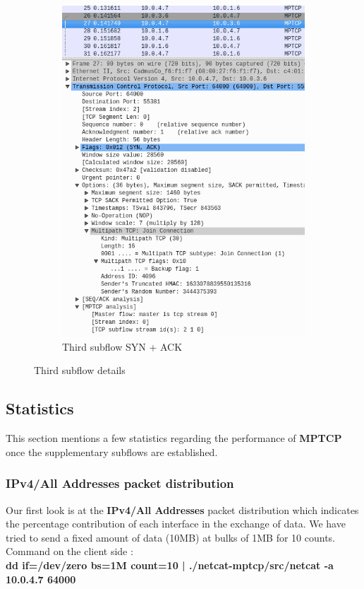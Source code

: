 \documentclass[a4paper,11pt]{article}
\begin{document}
\begin{figure}[h!]
\begin{subfigure}{.5\textwidth}
			  \includegraphics[width=.8\linewidth]{pictures/thirdflowresponse.jpg}
			  \caption{Third subflow SYN + ACK}
			\end{subfigure}
			\caption{Third subflow details}
			\end{figure}


	\clearpage
		\subsection{Statistics}
			\label{subsec:statistics}
			This section mentions a few statistics regarding the performance of \textbf{MPTCP} once the supplementary subflows are established.\\
			\subsubsection{IPv4/All Addresses packet distribution}
			\label{subsubsec:packetdistribution}
			Our first look is at the \textbf{IPv4/All Addresses} packet distribution which indicates the percentage contribution of each interface in the exchange of data. We have tried to send a fixed amount of data (10MB) at bulks of 1MB for 10 counts. Command on the client side :\\
			\textbf{dd if=/dev/zero bs=1M count=10 | ./netcat-mptcp/src/netcat -a 10.0.4.7 64000}
\end{document}
